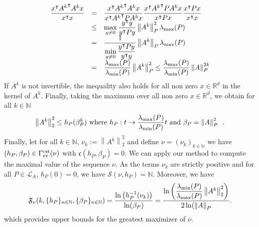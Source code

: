 \documentclass{article}
\def\funset{\Gamma}
\def\fcste{\funset_{{\rm ev}}^{\rm cst}}
\def\cst{\mathfrak{c}}
\def\norm#1{\left\|#1\right\|}
\def\rr{\mathbb R}
\def\rd{\rr^d}
\def\nn{\mathbb N}
\def\res{\mathcal{S}}
\def\lmax#1{\lambda_{\rm max}(#1)}
\def\lmin#1{\lambda_{\rm min}(#1)}
\def\red#1{#1}
\def\blue#1{#1}
\begin{document}
		\renewcommand{\arraystretch}{2}
		
		\[
		\begin{array}{lcl}
			\displaystyle{\dfrac{x^\intercal {A^k}^\intercal A^k x}{x^\intercal x}}&=&\displaystyle{\dfrac{x^\intercal {A^k}^\intercal A^k x}{x^\intercal {A^k}^\intercal P {A^k} x}\dfrac{x^\intercal {A^k}^\intercal P A^k x}{x^\intercal P x}\dfrac{x^\intercal P x}{x^\intercal x}}\\
			&\leq &\displaystyle{\max_{y\neq 0} \dfrac{y^\intercal y}{y^\intercal P y}\norm{A^k}_P^2\lmax{P}}\\
			&=&\displaystyle{\dfrac{1}{\displaystyle{\min_{y\neq 0} \frac{y^\intercal P y}{y^\intercal y}}}\norm{A^k}_P\lmax{P}}\\
			&=&\displaystyle{\dfrac{\lmax{P}}{\lmin{P}}\norm{A^k}_P^2}\leq\displaystyle{\dfrac{\lmax{P}}{\lmin{P}}\norm{A}_P^{2k}}
		\end{array}
		\]
		If $A^k$ is not invertible, the inequality also holds for all non zero $x\in\rd$ in the kernel of $A^k$. Finally, taking the maximum over all non zero $x\in\rd$, we \blue{obtain} for all $k\in\nn$
		\[
		\norm{A^k}_2^2\leq h_P(\beta_P^k) \text{ where } h_P:t \to \dfrac{\lmax{P}}{\lmin{P}}t \text{ and }
		\beta_P=\norm{A}_P^2\enspace.
		\]
		Finally, let for all $k\in\nn$, $\blue{\nu}_k:=\norm{A^k}_2^2$ and define $\blue{\nu}=(\blue{\nu}_k)_{k\in\nn}$ we have $(h_P,\beta_P)\in\fcste(\blue{\nu})$ with $\cst(h_P,\beta_P)=0$. We can apply our method to compute the maximal value of \red{the} sequence $\blue{\nu}$. As the terms $\blue{\nu}_k$ are strictly positive and for all $P\in\mathcal{L}_A$, $h_P(0)=0$, we have $\res(\blue{\nu},h_P)=\nn$. Moreover, we have
		\[
		\mathfrak{F}_{\blue{\nu}}(k,\{h_P\}_{n\in\nn},\{\beta_P\}_{n\in\nn})
		=\dfrac{\ln\left(h_P^{-1}(\blue{\nu}_k)\right)}{\ln(\beta_P)}=\dfrac{\ln\left(\dfrac{\lmin{P}}{\lmax{P}}\norm{A^k}_2^2\right)}{2\ln(\norm{A}_P}.
		\]
		which provides \red{upper bounds for} the greatest maximizer of $\blue{\nu}$. 
		
		\renewcommand{\arraystretch}{1}
		
\end{document}
